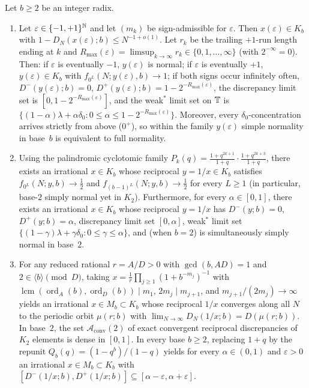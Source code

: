\documentclass[11pt]{article}
\DeclareMathOperator{\ord}{ord}
\DeclareMathOperator{\lcm}{lcm}
\begin{document}
\begin{maintheorem}\label{thm:C}
Let $b\ge2$ be an integer radix.
\begin{enumerate}[label=\textup{(\roman*)},nosep]
\item {} Let $\varepsilon\in\{-1,+1\}^{\mathbb N}$ and let $(m_k)$ be sign-admissible for $\varepsilon$. Then $x(\varepsilon)\in K_b$ with $1-D_N(x(\varepsilon);b)\le N^{-1+o(1)}$. Let $r_k$ be the trailing $+1$-run length ending at $k$ and $R_{\max}(\varepsilon)=\limsup_{k\to\infty}r_k\in\{0,1,\dots,\infty\}$ (with $2^{-\infty}=0$). Then: if $\varepsilon$ is eventually $-1$, $y(\varepsilon)$ is normal; if $\varepsilon$ is eventually $+1$, $y(\varepsilon)\in K_b$ with $f_{0^L}(N;y(\varepsilon),b)\to1$; if both signs occur infinitely often, $D^-(y(\varepsilon);b)=0$, $D^+(y(\varepsilon);b)=1-2^{-R_{\max}(\varepsilon)}$, the discrepancy limit set is $[0,1-2^{-R_{\max}(\varepsilon)}]$, and the weak$^*$ limit set on $\mathbb T$ is $\{(1-\alpha)\lambda+\alpha\delta_0:0\le\alpha\le 1-2^{-R_{\max}(\varepsilon)}\}$. Moreover, every $\delta_0$-concentration arrives strictly from above ($0^+$), so within the family $y(\varepsilon)$ simple normality in base~$b$ is equivalent to full normality.
\item {} Using the palindromic cyclotomic family $P_k(q)=\frac{1+q^{2k+1}}{1+q}\cdot\frac{1+q^{2k+3}}{1+q}$, there exists an irrational $x\in K_b$ whose reciprocal $y=1/x\in K_b$ satisfies $f_{0^L}(N;y,b)\to\frac12$ and $f_{(b-1)^L}(N;y,b)\to\frac12$ for every $L\ge1$ (in particular, base-$2$ simply normal yet in $K_2$). Furthermore, for every $\alpha\in[0,1]$, there exists an irrational $x\in K_b$ whose reciprocal $y=1/x$ has $D^-(y;b)=0$, $D^+(y;b)=\alpha$, discrepancy limit set $[0,\alpha]$, weak$^*$ limit set $\{(1-\gamma)\lambda+\gamma\delta_0:0\le\gamma\le\alpha\}$, and (when $b=2$) is simultaneously simply normal in base~$2$.
\item {} For any reduced rational $r=A/D>0$ with $\gcd(b,AD)=1$ and $2\in\langle b\rangle\pmod D$, taking $x=\frac1r\prod_{j\ge1}(1+b^{-m_j})^{-1}$ with $\lcm(\ord_A(b),\ord_D(b))\mid m_1$, $2m_j\mid m_{j+1}$, and $m_{j+1}/(2m_j)\to\infty$ yields an irrational $x\in M_b\subset K_b$ whose reciprocal $1/x$ converges along all $N$ to the periodic orbit $\mu(r;b)$ with $\lim_{N\to\infty}D_N(1/x;b)=D(\mu(r;b))$. In base~$2$, the set $\mathcal A_{\mathrm{conv}}(2)$ of exact convergent reciprocal discrepancies of $K_2$ elements is dense in $[0,1]$. In every base $b\ge2$, replacing $1+q$ by the repunit $Q_b(q)=(1-q^b)/(1-q)$ yields for every $\alpha\in(0,1)$ and $\varepsilon>0$ an irrational $x\in M_b\subset K_b$ with $[D^-(1/x;b),D^+(1/x;b)]\subseteq[\alpha-\varepsilon,\alpha+\varepsilon]$.
\end{enumerate}
\end{maintheorem}
\end{document}
